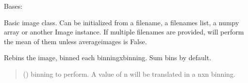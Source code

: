 \documentclass[letterpaper,10pt,english]{sphinxmanual}
\begin{document}
\begin{fulllineitems}
\label{\detokenize{micropolarray:micropolarray.image.Image}}
\pysigstartsignatures
{}
\pysigstopsignatures
\sphinxAtStartPar
Bases: 

\sphinxAtStartPar
Basic image class. Can be initialized from a filename, a filenames list, a numpy array or another Image instance. If multiple filenames are provided, will perform the mean of them unless averageimages is False.

\begin{fulllineitems}
\label{\detokenize{micropolarray:micropolarray.image.Image.data}}
\pysigstartsignatures
{}
\pysigstopsignatures
\end{fulllineitems}


\begin{fulllineitems}
\label{\detokenize{micropolarray:micropolarray.image.Image.rebin}}
\pysigstartsignatures
{}
\pysigstopsignatures
\sphinxAtStartPar
Rebins the image, binned each binningxbinning. Sum bins by default.
\begin{quote}\begin{description}
\sphinxAtStartPar
{} () \textendash{} binning to perform. A value of n will be translated in a nxn binning.


\end{description}
\end{quote}
\end{fulllineitems}
\end{fulllineitems}
\end{document}
